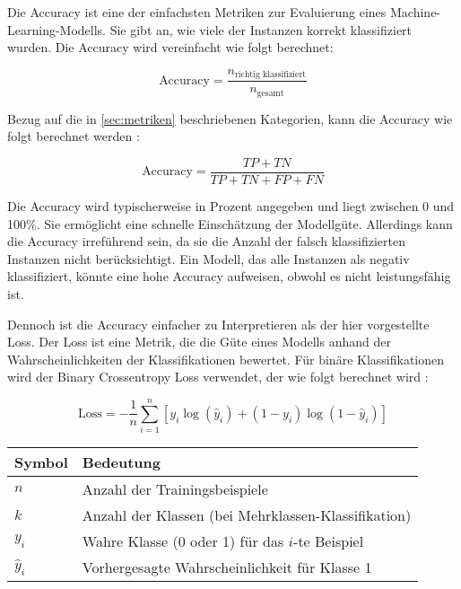 Die Accuracy ist eine der einfachsten Metriken zur Evaluierung eines Machine-Learning-Modells. Sie gibt an, wie viele der Instanzen korrekt klassifiziert wurden. Die Accuracy wird vereinfacht wie folgt berechnet:

\begin{equation}
    \text{Accuracy} = \frac{n_{\text{richtig klassifiziert}}}{n_{\text{gesamt}}}
\end{equation}

Bezug auf die in \autoref{sec:metriken} beschriebenen Kategorien, kann die Accuracy wie folgt berechnet werden \cite{ai_wiki_accuracy_2019}:

\begin{equation}
    \text{Accuracy} = \frac{TP + TN}{TP + TN + FP + FN} 
\end{equation}

Die Accuracy wird typischerweise in Prozent angegeben und liegt zwischen 0 und 100\%. Sie ermöglicht eine schnelle Einschätzung der Modellgüte. Allerdings kann die Accuracy irreführend sein, da sie die Anzahl der falsch klassifizierten Instanzen nicht berücksichtigt. Ein Modell, das alle Instanzen als negativ klassifiziert, könnte eine hohe Accuracy aufweisen, obwohl es nicht leistungsfähig ist.

Dennoch ist die Accuracy einfacher zu Interpretieren als der hier vorgestellte Loss. Der Loss ist eine Metrik, die die Güte eines Modells anhand der Wahrscheinlichkeiten der Klassifikationen bewertet. 
Für binäre Klassifikationen wird der Binary Crossentropy Loss verwendet, der wie folgt berechnet wird 
\cite{ai_wiki_accuracy_2019}:

\begin{equation}
    \text{Loss} = -\frac{1}{n} \sum_{i=1}^{n} \left[ y_i \log(\hat{y}_i) + (1 - y_i) \log(1 - \hat{y}_i) \right]
    \label{eq:binary_crossentropy}
\end{equation}

\begin{tabular}{ll}
    \hline
    \textbf{Symbol} & \textbf{Bedeutung} \\
    \hline
    $n$ & Anzahl der Trainingsbeispiele \\
    $k$ & Anzahl der Klassen (bei Mehrklassen-Klassifikation) \\
    $y_i$ & Wahre Klasse (0 oder 1) für das $i$-te Beispiel \\
    $\hat{y}_i$ & Vorhergesagte Wahrscheinlichkeit für Klasse 1 \\
    \hline
\end{tabular}


